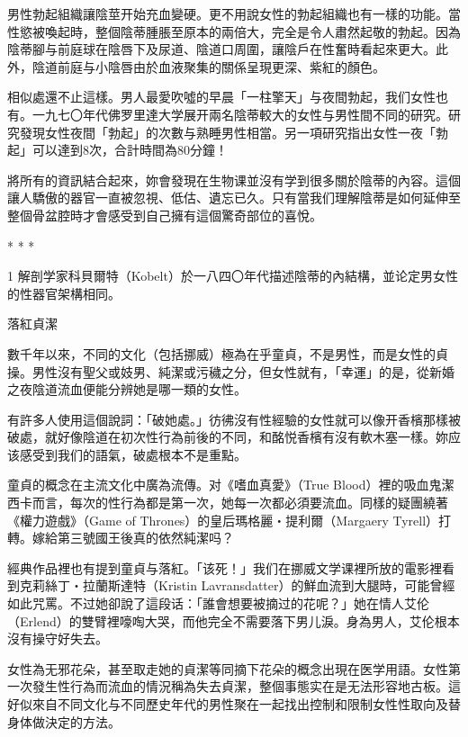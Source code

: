 \documentclass[12pt,UTF8]{ctexbook}
\begin{document}
男性勃起組織讓陰莖开始充血變硬。更不用說女性的勃起組織也有一樣的功能。當性慾被喚起時，整個陰蒂腫脹至原本的兩倍大，完全是令人肅然起敬的勃起。因為陰蒂腳与前庭球在陰唇下及尿道、陰道口周圍，讓陰戶在性奮時看起來更大。此外，陰道前庭与小陰唇由於血液聚集的關係呈現更深、紫紅的顏色。

相似處還不止這樣。男人最愛吹噓的早晨「一柱擎天」与夜間勃起，我们女性也有。一九七〇年代佛罗里達大学展开兩名陰蒂較大的女性与男性間不同的研究。研究發現女性夜間「勃起」的次數与熟睡男性相當。另一項研究指出女性一夜「勃起」可以達到8次，合計時間為80分鐘！

將所有的資訊結合起來，妳會發現在生物课並沒有学到很多關於陰蒂的內容。這個讓人驕傲的器官一直被忽視、低估、遺忘已久。只有當我们理解陰蒂是如何延伸至整個骨盆腔時才會感受到自己擁有這個驚奇部位的喜悅。





* * *



1	解剖学家科貝爾特（Kobelt）於一八四〇年代描述陰蒂的內結構，並论定男女性的性器官架構相同。





落紅貞潔




數千年以來，不同的文化（包括挪威）極為在乎童貞，不是男性，而是女性的貞操。男性沒有聖父或妓男、純潔或污穢之分，但女性就有，「幸運」的是，從新婚之夜陰道流血便能分辨她是哪一類的女性。

有許多人使用這個說詞：「破她處。」彷彿沒有性經驗的女性就可以像开香檳那樣被破處，就好像陰道在初次性行為前後的不同，和酩悦香檳有沒有軟木塞一樣。妳应该感受到我们的語氣，破處根本不是重點。

童貞的概念在主流文化中廣為流傳。对《嗜血真愛》（True Blood）裡的吸血鬼潔西卡而言，每次的性行為都是第一次，她每一次都必須要流血。同樣的疑團繞著《權力遊戲》（Game of Thrones）的皇后瑪格麗‧提利爾（Margaery Tyrell）打轉。嫁給第三號國王後真的依然純潔吗？

經典作品裡也有提到童貞与落紅。「该死！」我们在挪威文学课裡所放的電影裡看到克莉絲丁‧拉蘭斯達特（Kristin Lavransdatter）的鮮血流到大腿時，可能曾經如此咒罵。不过她卻說了這段话：「誰會想要被摘过的花呢？」她在情人艾伦（Erlend）的雙臂裡嚎啕大哭，而他完全不需要落下男儿淚。身為男人，艾伦根本沒有操守好失去。

女性為无邪花朵，甚至取走她的貞潔等同摘下花朵的概念出現在医学用語。女性第一次發生性行為而流血的情況稱為失去貞潔，整個事態实在是无法形容地古板。這好似來自不同文化与不同歷史年代的男性聚在一起找出控制和限制女性性取向及替身体做決定的方法。
\end{document}

